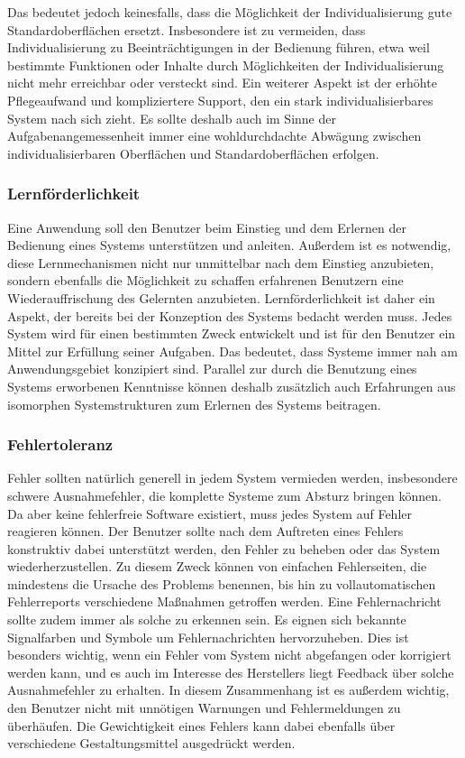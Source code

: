 Das bedeutet jedoch keinesfalls, dass die Möglichkeit der Individualisierung gute Standardoberflächen ersetzt. Insbesondere ist zu vermeiden, dass Individualisierung zu Beeinträchtigungen in der Bedienung führen, etwa weil bestimmte Funktionen oder Inhalte durch Möglichkeiten der Individualisierung nicht mehr erreichbar oder versteckt sind. Ein weiterer Aspekt ist der erhöhte Pflegeaufwand und kompliziertere Support, den ein stark individualisierbares System nach sich zieht. Es sollte deshalb auch im Sinne der Aufgabenangemessenheit immer eine wohldurchdachte Abwägung zwischen individualisierbaren Oberflächen und Standardoberflächen erfolgen. \parencite[vgl.][189]{Herczeg2009}

\subsubsection{Lernförderlichkeit}

Eine Anwendung soll den Benutzer beim Einstieg und dem Erlernen der Bedienung eines Systems unterstützen und
anleiten. Außerdem ist es notwendig, diese Lernmechanismen nicht nur unmittelbar nach dem Einstieg anzubieten, sondern ebenfalls die Möglichkeit zu schaffen erfahrenen Benutzern eine Wiederauffrischung des Gelernten anzubieten. Lernförderlichkeit ist daher ein Aspekt, der bereits bei der Konzeption des Systems bedacht werden muss. Jedes System wird für einen bestimmten Zweck entwickelt und ist für den Benutzer ein Mittel zur Erfüllung seiner Aufgaben. Das bedeutet, dass Systeme immer nah am Anwendungsgebiet konzipiert sind. Parallel zur durch die Benutzung eines Systems erworbenen Kenntnisse können deshalb zusätzlich auch Erfahrungen aus isomorphen Systemstrukturen zum Erlernen des Systems beitragen. \parencite[vgl.][177\psqq]{Herczeg2009}

\subsubsection{Fehlertoleranz}

Fehler sollten natürlich generell in jedem System vermieden werden, insbesondere schwere Ausnahmefehler, die komplette Systeme zum Absturz bringen können. Da aber keine fehlerfreie Software existiert, muss jedes System auf Fehler reagieren können. Der Benutzer sollte nach dem Auftreten eines Fehlers konstruktiv dabei unterstützt werden, den Fehler zu beheben oder das System wiederherzustellen. Zu diesem Zweck können von einfachen Fehlerseiten, die mindestens die Ursache des Problems benennen, bis hin zu vollautomatischen Fehlerreports verschiedene Maßnahmen getroffen werden. Eine Fehlernachricht sollte zudem immer als solche zu erkennen sein. Es eignen sich bekannte Signalfarben und Symbole um Fehlernachrichten hervorzuheben. \parencite[vgl.][182\psqq]{Herczeg2009} Dies ist besonders wichtig, wenn ein Fehler vom System nicht abgefangen oder korrigiert werden kann, und es auch im Interesse des Herstellers liegt Feedback über solche Ausnahmefehler zu erhalten. In diesem Zusammenhang ist es außerdem wichtig, den Benutzer nicht mit unnötigen Warnungen und Fehlermeldungen zu überhäufen. Die Gewichtigkeit eines Fehlers kann dabei ebenfalls über verschiedene Gestaltungsmittel ausgedrückt werden.\parencite[vgl.][185\psq]{Herczeg2009}

